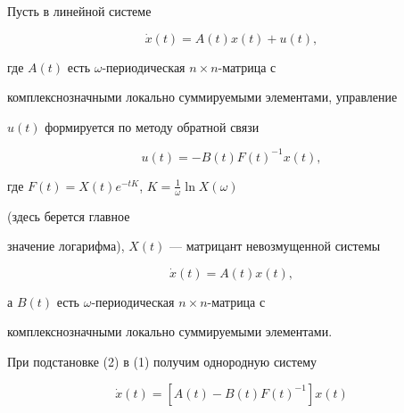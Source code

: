 \date{}




\pagestyle{plain} %







\maketitle


\label{begin}








Пусть в линейной системе


\begin{equation}


\Dot x(t) = A(t)x(t) + u(t),


\end{equation}


где $A(t)$ есть $\omega$-периодическая $n\times n$-матрица с


комплекснозначными локально суммируемыми элементами, управление


$u(t)$ формируется по методу обратной связи


\begin{equation}


u(t) = - B(t)F(t)^{-1}x(t),


\end{equation}


где $F(t)=X(t)e^{-tK}$, $K=\frac{1}{\omega}\ln X(\omega)$


(здесь берется главное


значение логарифма), $X(t)$ --- матрицант невозмущенной системы


\begin{equation}


\Dot x(t) = A(t)x(t),


\end{equation}


а $B(t)$ есть $\omega$-периодическая $n\times n$-матрица с


комплекснозначными локально суммируемыми элементами.





При подстановке (2) в (1) получим однородную систему


\begin{equation}


\Dot x(t) = [A(t) - B(t)F(t)^{-1}]x(t)


\end{equation}


